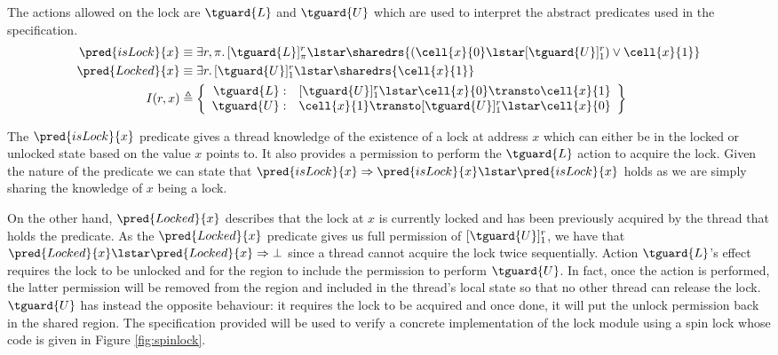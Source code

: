 The actions allowed on the lock are $\tguard{L}$ and $\tguard{U}$ which are used to interpret the abstract predicates used in the specification.
\begin{align*}
\pred{isLock}{x} &\equiv \exists r, \pi \ldotp [\tguard{L}]_\pi^r \lstar \sharedrs{(\cell{x}{0} \lstar [\tguard{U}]_1^r) \lor \cell{x}{1}}
\\
\pred{Locked}{x} &\equiv \exists r \ldotp [\tguard{U}]_1^r \lstar \sharedrs{\cell{x}{1}}
\\
I(r, x) &\triangleq 
\left\lbrace
\begin{array}{rl}
\tguard{L}: & [\tguard{U}]_1^r \lstar \cell{x}{0} \transto \cell{x}{1} \\
\tguard{U}: & \cell{x}{1} \transto [\tguard{U}]_1^r \lstar \cell{x}{0}
\end{array}
\right\rbrace
\end{align*}

The $\pred{isLock}{x}$ predicate gives a thread knowledge of the existence of a lock at address $x$ which can either be in the locked or unlocked state based on the value $x$ points to. It also provides a permission to perform the $\tguard{L}$ action to acquire the lock. Given the nature of the predicate we can state that $\pred{isLock}{x} \Rightarrow \pred{isLock}{x} \lstar \pred{isLock}{x}$ holds as we are simply sharing the knowledge of $x$ being a lock.

On the other hand, $\pred{Locked}{x}$ describes that the lock at $x$ is currently locked and has been previously acquired by the thread that holds the predicate. As the $\pred{Locked}{x}$ predicate gives us full permission of $[\tguard{U}]_1^r$, we have that $\pred{Locked}{x} \lstar \pred{Locked}{x} \Rightarrow \bot$ since a thread cannot acquire the lock twice sequentially. Action $\tguard{L}$'s effect requires the lock to be unlocked and for the region to include the permission to perform $\tguard{U}$. In fact, once the action is performed, the latter permission will be removed from the region and included in the thread's local state so that no other thread can release the lock. $\tguard{U}$ has instead the opposite behaviour: it requires the lock to be acquired and once done, it will put the unlock permission back in the shared region. The specification provided will be used to verify a concrete implementation of the lock module using a spin lock whose code is given in Figure \ref{fig:spinlock}.

